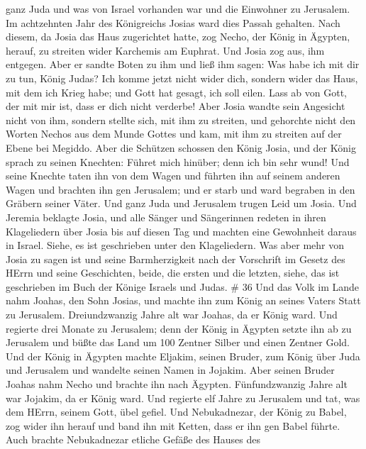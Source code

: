 ganz Juda und was von Israel vorhanden war und die Einwohner zu
Jerusalem.  Im achtzehnten Jahr des Königreichs Josias ward
dies Passah gehalten.  Nach diesem, da Josia das Haus
zugerichtet hatte, zog Necho, der König in Ägypten, herauf, zu streiten
wider Karchemis am Euphrat. Und Josia zog aus, ihm entgegen.
 Aber er sandte Boten zu ihm und ließ ihm sagen: Was habe
ich mit dir zu tun, König Judas? Ich komme jetzt nicht wider dich,
sondern wider das Haus, mit dem ich Krieg habe; und Gott hat gesagt, ich
soll eilen. Lass ab von Gott, der mit mir ist, dass er dich nicht
verderbe!  Aber Josia wandte sein Angesicht nicht von ihm,
sondern stellte sich, mit ihm zu streiten, und gehorchte nicht den
Worten Nechos aus dem Munde Gottes und kam, mit ihm zu streiten auf der
Ebene bei Megiddo.  Aber die Schützen schossen den König
Josia, und der König sprach zu seinen Knechten: Führet mich hinüber;
denn ich bin sehr wund!  Und seine Knechte taten ihn von
dem Wagen und führten ihn auf seinem anderen Wagen und brachten ihn gen
Jerusalem; und er starb und ward begraben in den Gräbern seiner Väter.
Und ganz Juda und Jerusalem trugen Leid um Josia.  Und
Jeremia beklagte Josia, und alle Sänger und Sängerinnen redeten in ihren
Klageliedern über Josia bis auf diesen Tag und machten eine Gewohnheit
daraus in Israel. Siehe, es ist geschrieben unter den Klageliedern.
 Was aber mehr von Josia zu sagen ist und seine
Barmherzigkeit nach der Vorschrift im Gesetz des HErrn  und
seine Geschichten, beide, die ersten und die letzten, siehe, das ist
geschrieben im Buch der Könige Israels und Judas. \# 36  Und
das Volk im Lande nahm Joahas, den Sohn Josias, und machte ihn zum König
an seines Vaters Statt zu Jerusalem.  Dreiundzwanzig Jahre
alt war Joahas, da er König ward. Und regierte drei Monate zu Jerusalem;
 denn der König in Ägypten setzte ihn ab zu Jerusalem und
büßte das Land um 100 Zentner Silber und einen Zentner Gold.
 Und der König in Ägypten machte Eljakim, seinen Bruder, zum
König über Juda und Jerusalem und wandelte seinen Namen in Jojakim. Aber
seinen Bruder Joahas nahm Necho und brachte ihn nach Ägypten.
 Fünfundzwanzig Jahre alt war Jojakim, da er König ward. Und
regierte elf Jahre zu Jerusalem und tat, was dem HErrn, seinem Gott,
übel gefiel.  Und Nebukadnezar, der König zu Babel, zog
wider ihn herauf und band ihn mit Ketten, dass er ihn gen Babel führte.
 Auch brachte Nebukadnezar etliche Gefäße des Hauses des

